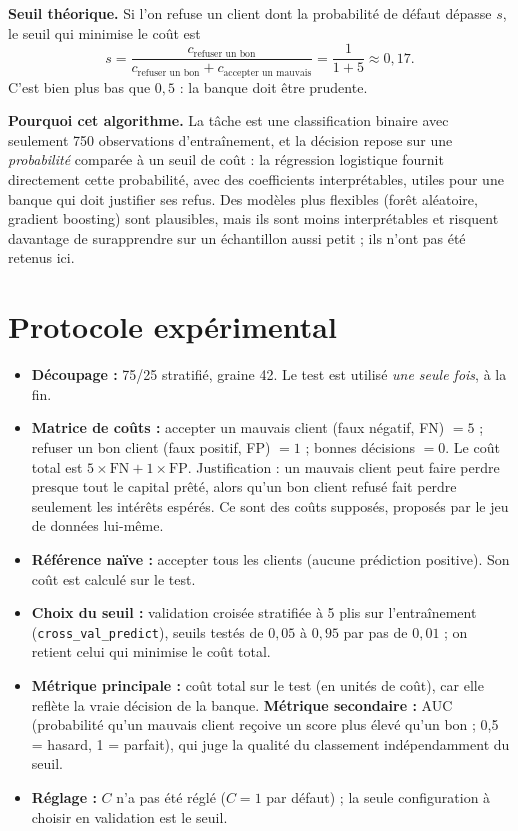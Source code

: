 \documentclass[11pt,a4paper]{article}
\begin{document}
\textbf{Seuil théorique.} Si l'on refuse un client dont la probabilité de défaut dépasse $s$, le seuil qui minimise le coût est
\begin{equation}
s=\frac{c_{\text{refuser un bon}}}{c_{\text{refuser un bon}}+c_{\text{accepter un mauvais}}}=\frac{1}{1+5}\approx 0{,}17 .
\end{equation}
C'est bien plus bas que $0{,}5$ : la banque doit être prudente.

\textbf{Pourquoi cet algorithme.} La tâche est une classification binaire avec seulement 750 observations d'entraînement, et la décision repose sur une \emph{probabilité} comparée à un seuil de coût : la régression logistique fournit directement cette probabilité, avec des coefficients interprétables, utiles pour une banque qui doit justifier ses refus. Des modèles plus flexibles (forêt aléatoire, gradient boosting) sont plausibles, mais ils sont moins interprétables et risquent davantage de surapprendre sur un échantillon aussi petit ; ils n'ont pas été retenus ici.

\section{Protocole expérimental}
\begin{itemize}[nosep]
  \item \textbf{Découpage :} 75/25 stratifié, graine 42. Le test est utilisé \emph{une seule fois}, à la fin.
  \item \textbf{Matrice de coûts :} accepter un mauvais client (faux négatif, FN) $=5$ ; refuser un bon client (faux positif, FP) $=1$ ; bonnes décisions $=0$. Le coût total est $5\times \text{FN}+1\times \text{FP}$. Justification : un mauvais client peut faire perdre presque tout le capital prêté, alors qu'un bon client refusé fait perdre seulement les intérêts espérés. Ce sont des coûts supposés, proposés par le jeu de données lui-même.
  \item \textbf{Référence naïve :} accepter tous les clients (aucune prédiction positive). Son coût est calculé sur le test.
  \item \textbf{Choix du seuil :} validation croisée stratifiée à 5 plis sur l'entraînement (\texttt{cross\_val\_predict}), seuils testés de $0{,}05$ à $0{,}95$ par pas de $0{,}01$ ; on retient celui qui minimise le coût total.
  \item \textbf{Métrique principale :} coût total sur le test (en unités de coût), car elle reflète la vraie décision de la banque. \textbf{Métrique secondaire :} AUC (probabilité qu'un mauvais client reçoive un score plus élevé qu'un bon ; 0,5 = hasard, 1 = parfait), qui juge la qualité du classement indépendamment du seuil.
  \item \textbf{Réglage :} $C$ n'a pas été réglé ($C=1$ par défaut) ; la seule configuration à choisir en validation est le seuil.
\end{itemize}
\end{document}
